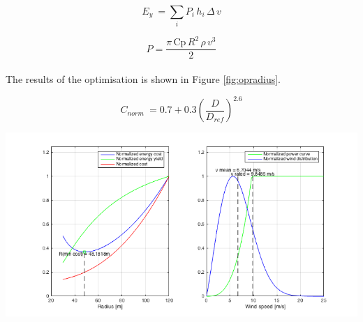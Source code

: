 \\
\begin{equation}
E_{y}\ = \sum_{i} P_{i}\, h_{i}\, \Delta \, v
\label{eq:E}
\end{equation}

\begin{equation}
P = \frac{\pi\, \mathrm{Cp}\, R^2\, \rho\, v^3}{2}
\label{eq:P}
\end{equation}
\\
The results of the optimisation is shown in Figure \ref{fig:opradius}.

\begin{equation}
C_{norm}\ = 0.7 + 0.3 {\left(\frac{D}{D_{ref}}\right)}^{2.6}
\label{eq:C}
\end{equation}

\includegraphics[width=15cm]{Images/op_radius.png} \label{fig:opradius}\\